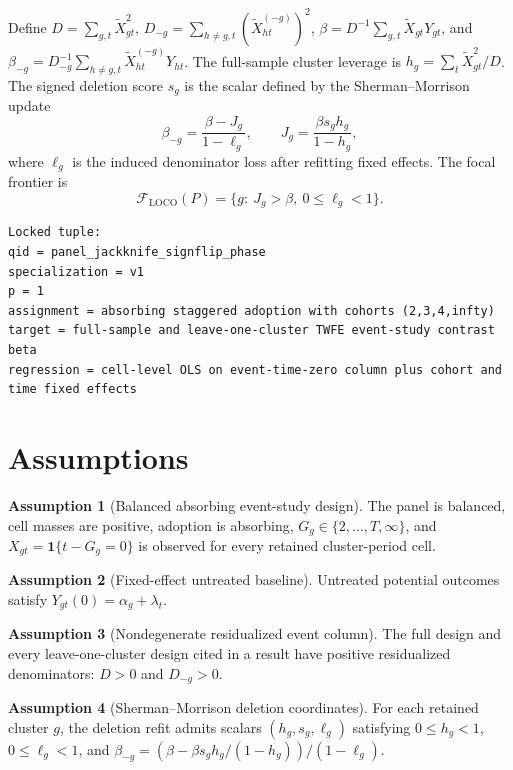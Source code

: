 \documentclass[11pt]{article}
\newcommand{\one}{\mathbf{1}}
\theoremstyle{definition}
\newtheorem{assumption}{Assumption}
\theoremstyle{plain}
\theoremstyle{remark}
\begin{document}
Define $D=\sum_{g,t}\tilde X_{gt}^{2}$, $D_{-g}=\sum_{h\neq g,t}(\tilde X^{(-g)}_{ht})^2$, $\beta=D^{-1}\sum_{g,t}\tilde X_{gt}Y_{gt}$, and $\beta_{-g}=D_{-g}^{-1}\sum_{h\neq g,t}\tilde X^{(-g)}_{ht}Y_{ht}$. The full-sample cluster leverage is $h_g=\sum_t\tilde X_{gt}^{2}/D$. The signed deletion score $s_g$ is the scalar defined by the Sherman--Morrison update
\[
\beta_{-g}=\frac{\beta-J_g}{1-\ell_g},\qquad J_g=\frac{\beta s_g h_g}{1-h_g},
\]
where $\ell_g$ is the induced denominator loss after refitting fixed effects. The focal frontier is
\[
\mathcal{F}_{\mathrm{LOCO}}(P)=\{g:\ J_g>\beta,\ 0\leq \ell_g<1\}.
\]

\begin{verbatim}
Locked tuple:
qid = panel_jackknife_signflip_phase
specialization = v1
p = 1
assignment = absorbing staggered adoption with cohorts (2,3,4,infty)
target = full-sample and leave-one-cluster TWFE event-study contrast beta
regression = cell-level OLS on event-time-zero column plus cohort and time fixed effects
\end{verbatim}

\section{Assumptions}
\begin{assumption}[Balanced absorbing event-study design]\label{ass:design}
The panel is balanced, cell masses are positive, adoption is absorbing, $G_g\in\{2,\ldots,T,\infty\}$, and $X_{gt}=\one\{t-G_g=0\}$ is observed for every retained cluster-period cell.
\end{assumption}

\begin{assumption}[Fixed-effect untreated baseline]\label{ass:baseline}
Untreated potential outcomes satisfy $Y_{gt}(0)=\alpha_g+\lambda_t$.
\end{assumption}

\begin{assumption}[Nondegenerate residualized event column]\label{ass:rank}
The full design and every leave-one-cluster design cited in a result have positive residualized denominators: $D>0$ and $D_{-g}>0$.
\end{assumption}

\begin{assumption}[Sherman--Morrison deletion coordinates]\label{ass:sm}
For each retained cluster $g$, the deletion refit admits scalars $(h_g,s_g,\ell_g)$ satisfying $0\leq h_g<1$, $0\leq \ell_g<1$, and $\beta_{-g}=(\beta-\beta s_g h_g/(1-h_g))/(1-\ell_g)$.
\end{assumption}
\end{document}
